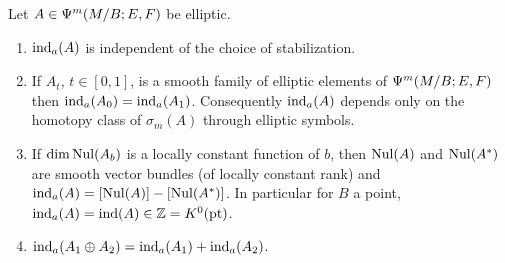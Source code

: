 \begin{theorem}\label{product:thm:index-bundle}
Let $A\in\Psi^{m}(M/B;E,F)$ be elliptic.
\begin{enumerate}[label=\textup{(\roman*)}]
\item $\operatorname{ind}_a(A)$ is independent of the choice of stabilization.
\item If $A_t$, $t\in[0,1]$, is a smooth family of elliptic elements of
$\Psi^{m}(M/B;E,F)$ then $\operatorname{ind}_a(A_0)=\operatorname{ind}_a(A_1)$. Consequently $\operatorname{ind}_a(A)$
depends only on the homotopy class of $\sigma_m(A)$ through elliptic symbols.
\item If $\dim\operatorname{Nul}(A_b)$ is a locally constant function of $b$, then $\operatorname{Nul}(A)$ and
$\operatorname{Nul}(A^*)$ are smooth vector bundles \textup{(}of locally constant rank\textup{)} and
$\operatorname{ind}_a(A)=[\operatorname{Nul}(A)]-[\operatorname{Nul}(A^*)]$. In particular for
$B$ a point, $\operatorname{ind}_a(A)=\operatorname{ind}(A)\in\mathbb{Z}=K^0(\mathrm{pt})$.
\item $\operatorname{ind}_a(A_1\oplus A_2)=\operatorname{ind}_a(A_1)+\operatorname{ind}_a(A_2)$.
\end{enumerate}
\end{theorem}

